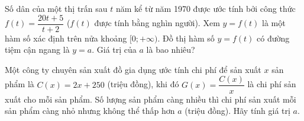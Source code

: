\begin{bt}%
	Số dân của một thị trấn sau $t$  năm kể từ năm 1970 được ước tính bởi công thức $f(t) = \dfrac{20t+5}{t+2}$ ($f(t)$ được tính bằng nghìn người). Xem $y=f(t)$  là một hàm số xác định trên nửa khoảng $[0; +\infty)$. Đồ thị hàm số $y=f(t)$ có đường tiệm cận ngang là  $y=a$. Giá trị của $a$ là bao nhiêu?
\end{bt}

\begin{bt}%
	Một công ty chuyên sản xuất đồ gia dụng ước tính chi phí để sản xuất $x$   sản phẩm là $C(x)=2x+250$ (triệu đồng), khi đó $G(x)=\dfrac{C(x)}{x}$  là chi phí sản xuất cho mỗi sản phẩm. Số lượng sản phẩm càng nhiều thì chi phí sản xuất mỗi sản phẩm càng nhỏ nhưng không thể thấp hơn $a$ (triệu đồng). Hãy tính giá trị $a$.
	
\end{bt}

